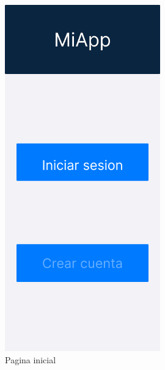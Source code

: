 \begin{figure}[H]
   \centering
    \includegraphics[width=0.6\textwidth]{fotos/Frame 22.png}
    \caption{Pagina inicial}
    \label{fig:Pagina inicial}
\end{figure}
